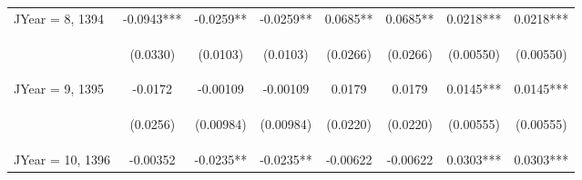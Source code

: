 \documentclass[]{article}
\begin{document}
\begin{center}
\begin{tabular}{lccccccc}
JYear = 8, 1394 & -0.0943*** & -0.0259** & -0.0259** & 0.0685** & 0.0685** & 0.0218*** & 0.0218*** \\
\vspace{4pt} & \begin{footnotesize}(0.0330)\end{footnotesize} & \begin{footnotesize}(0.0103)\end{footnotesize} & \begin{footnotesize}(0.0103)\end{footnotesize} & \begin{footnotesize}(0.0266)\end{footnotesize} & \begin{footnotesize}(0.0266)\end{footnotesize} & \begin{footnotesize}(0.00550)\end{footnotesize} & \begin{footnotesize}(0.00550)\end{footnotesize} \\
JYear = 9, 1395 & -0.0172 & -0.00109 & -0.00109 & 0.0179 & 0.0179 & 0.0145*** & 0.0145*** \\
\vspace{4pt} & \begin{footnotesize}(0.0256)\end{footnotesize} & \begin{footnotesize}(0.00984)\end{footnotesize} & \begin{footnotesize}(0.00984)\end{footnotesize} & \begin{footnotesize}(0.0220)\end{footnotesize} & \begin{footnotesize}(0.0220)\end{footnotesize} & \begin{footnotesize}(0.00555)\end{footnotesize} & \begin{footnotesize}(0.00555)\end{footnotesize} \\
JYear = 10, 1396 & -0.00352 & -0.0235** & -0.0235** & -0.00622 & -0.00622 & 0.0303*** & 0.0303*** \\

\end{tabular}
\end{center}
\end{document}
